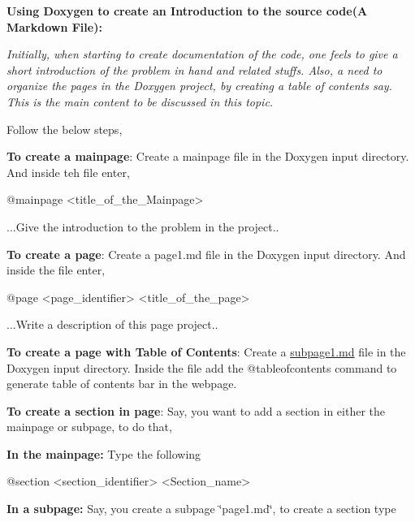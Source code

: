 \label{md_code_subpage2_subpage2}%
%
 {\bfseries{Using Doxygen to create an Introduction to the source code(\+A Markdown File)\+:}}

 {\itshape Initially, when starting to create documentation of the code, one feels to give a short introduction of the problem in hand and related stuffs. Also, a need to organize the pages in the Doxygen project, by creating a table of contents say. This is the main content to be discussed in this topic.}



Follow the below steps,
\begin{DoxyEnumerate}
\item {\bfseries{To create a mainpage}}\+: Create a mainpage file in the Doxygen input directory. And inside teh file enter, \begin{DoxyVerb}@mainpage <title_of_the_Mainpage>

...Give the introduction to the problem in the project.. \end{DoxyVerb}

\item {\bfseries{To create a page}}\+: Create a page1.\+md file in the Doxygen input directory. And inside the file enter, \begin{DoxyVerb}@page <page_identifier> <title_of_the_page>

...Write a description of this page project.. \end{DoxyVerb}

\end{DoxyEnumerate}
\begin{DoxyEnumerate}
\item {\bfseries{To create a page with Table of Contents}}\+: Create a \mbox{\hyperlink{subpage1_8md}{subpage1.\+md}} file in the Doxygen input directory. Inside the file add the {\ttfamily @}tableofcontents command to generate table of contents bar in the webpage.
\item {\bfseries{To create a section in page}}\+: Say, you want to add a section in either the mainpage or subpage, to do that,
\end{DoxyEnumerate}
\begin{DoxyEnumerate}
\item {\bfseries{In the mainpage\+:}} Type the following \begin{DoxyVerb}@section <section_identifier> <Section_name>
\end{DoxyVerb}

\item {\bfseries{In a subpage\+:}} Say, you create a subpage \char`\"{}page1.\+md\char`\"{}, to create a section type 
\end{DoxyEnumerate}